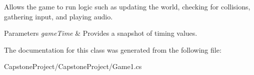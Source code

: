 Allows the game to run logic such as updating the world, checking for collisions, gathering input, and playing audio. 


\begin{DoxyParams}{Parameters}
{\em game\-Time} & Provides a snapshot of timing values.\\
\hline
\end{DoxyParams}


The documentation for this class was generated from the following file\-:\begin{DoxyCompactItemize}
\item 
Capstone\-Project/\-Capstone\-Project/Game1.\-cs\end{DoxyCompactItemize}

